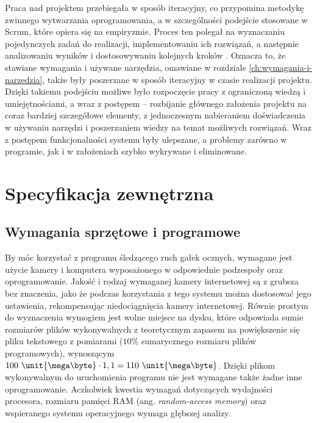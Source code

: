 \documentclass[a4paper,twoside,12pt]{book}
\newcommand{\obcy}[1]{\emph{#1}}
\newcommand{\english}[1]{{\selectlanguage{british}\obcy{#1}}}
\begin{document}
Praca nad projektem przebiegała w sposób iteracyjny, co przypomina metodykę zwinnego wytwarzania oprogramowania, a w szczególności podejście stosowane w Scrum, które opiera się na empiryzmie. Proces ten polegał na wyznaczaniu pojedynczych zadań do realizacji, implementowaniu ich rozwiązań, a następnie analizowaniu wyników i dostosowywaniu kolejnych kroków \cite{bib:Scrum-guide}. Oznacza to, że stawiane wymagania i używane narzędzia, omawiane w rozdziale \ref{ch:wymagania-i-narzedzia}, także były poszerzane w sposób iteracyjny w czasie realizacji projektu. Dzięki takiemu podejściu możliwe było rozpoczęcie pracy z ograniczoną wiedzą i umiejętnościami, a wraz z postępem -- rozbijanie głównego założenia projektu na coraz bardziej szczegółowe elementy, z jednoczesnym nabieraniem doświadczenia w używaniu narzędzi i poszerzaniem wiedzy na temat możliwych rozwiązań. Wraz z postępem funkcjonalności systemu były ulepszane, a problemy zarówno w programie, jak i w założeniach szybko wykrywane i eliminowane.




%
%
%
\chapter{Specyfikacja zewnętrzna}
\label{ch:Specyfikacja-zewnetrzna}

\section{Wymagania sprzętowe i programowe}


By móc korzystać z programu śledzącego ruch gałek ocznych, wymagane jest użycie kamery i komputera wyposażonego w odpowiednie podzespoły oraz oprogramowanie. Jakość i rodzaj wymaganej kamery internetowej są z grubsza bez znaczenia, jako że podczas korzystania z tego systemu można dostosować jego ustawienia, rekompensując niedociągnięcia kamery internetowej. Równie prostym do wyznaczenia wymogiem jest wolne miejsce na dysku, które odpowiada sumie rozmiarów plików wykonywalnych z teoretycznym zapasem na powiększenie się pliku tekstowego z pomiarami ($10\%$ sumarycznego rozmiaru plików programowych), wynoszącym $100 \ \unit{\mega\byte} \cdot 1,1 = 110 \ \unit{\mega\byte}$. Dzięki plikom wykonywalnym do uruchomienia programu nie jest wymagane także żadne inne oprogramowanie. Aczkolwiek kwestia wymagań dotyczących wydajności procesora, rozmiaru pamięci RAM (ang. \english{random-access memory}) oraz wspieranego systemu operacyjnego wymaga głębszej analizy.
\end{document}
